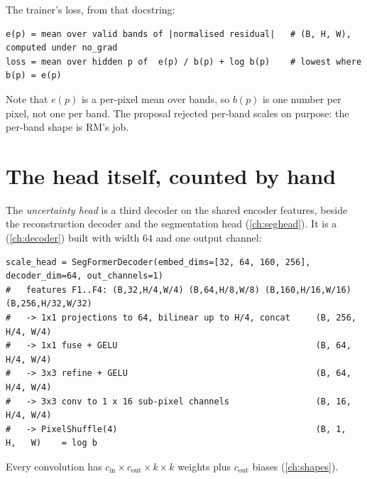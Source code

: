 The trainer's loss, from that docstring:
\begin{lstlisting}
e(p) = mean over valid bands of |normalised residual|   # (B, H, W), computed under no_grad
loss = mean over hidden p of  e(p) / b(p) + log b(p)    # lowest where b(p) = e(p)
\end{lstlisting}
Note that $e(p)$ is a per-pixel mean over bands, so $b(p)$ is one number per pixel, not one per band. The
proposal rejected per-band scales on purpose: the per-band shape is RM's job.

\section{The head itself, counted by hand}\label{sec:uncertainty:head}

The \emph{uncertainty head} is a third decoder on the shared encoder features, beside
the reconstruction decoder and the segmentation head (\cref{ch:seghead}). It is a 
(\cref{ch:decoder}) built with width $64$ and one output channel:
\begin{lstlisting}
scale_head = SegFormerDecoder(embed_dims=[32, 64, 160, 256], decoder_dim=64, out_channels=1)
#   features F1..F4: (B,32,H/4,W/4) (B,64,H/8,W/8) (B,160,H/16,W/16) (B,256,H/32,W/32)
#   -> 1x1 projections to 64, bilinear up to H/4, concat     (B, 256, H/4, W/4)
#   -> 1x1 fuse + GELU                                       (B, 64,  H/4, W/4)
#   -> 3x3 refine + GELU                                     (B, 64,  H/4, W/4)
#   -> 3x3 conv to 1 x 16 sub-pixel channels                 (B, 16,  H/4, W/4)
#   -> PixelShuffle(4)                                       (B, 1,   H,   W)    = log b
\end{lstlisting}
Every convolution has $c_\text{in}\times c_\text{out}\times k\times k$ weights plus $c_\text{out}$ biases
(\cref{ch:shapes}).

